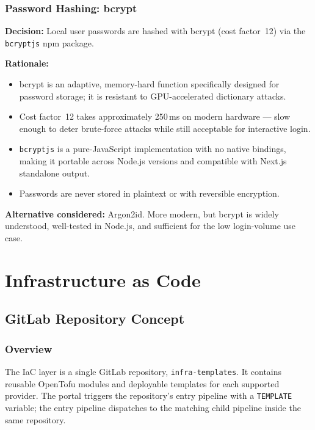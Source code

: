 \documentclass[12pt,a4paper,twoside]{report}
\newcommand{\code}[1]{\texttt{#1}}
\begin{document}
\section{Password Hashing: bcrypt}

\textbf{Decision:} Local user passwords are hashed with bcrypt (cost
factor~12) via the \code{bcryptjs} npm package.

\textbf{Rationale:}
\begin{itemize}
  \item bcrypt is an adaptive, memory-hard function specifically designed
        for password storage; it is resistant to GPU-accelerated
        dictionary attacks.
  \item Cost factor~12 takes approximately 250\,ms on modern hardware —
        slow enough to deter brute-force attacks while still acceptable
        for interactive login.
  \item \code{bcryptjs} is a pure-JavaScript implementation with no
        native bindings, making it portable across Node.js versions and
        compatible with Next.js standalone output.
  \item Passwords are never stored in plaintext or with reversible
        encryption.
\end{itemize}

\textbf{Alternative considered:} Argon2id. More modern, but bcrypt is
widely understood, well-tested in Node.js, and sufficient for the low
login-volume use case.

\part{Infrastructure as Code}
\label{part:iac}

\chapter{GitLab Repository Concept}
\label{ch:gitlab-concept}

\section{Overview}

The IaC layer is a single GitLab repository, \code{infra-templates}.
It contains reusable OpenTofu modules and deployable templates for each
supported provider. The portal triggers the repository's entry pipeline
with a \code{TEMPLATE} variable; the entry pipeline dispatches to the
matching child pipeline inside the same repository.
\end{document}
